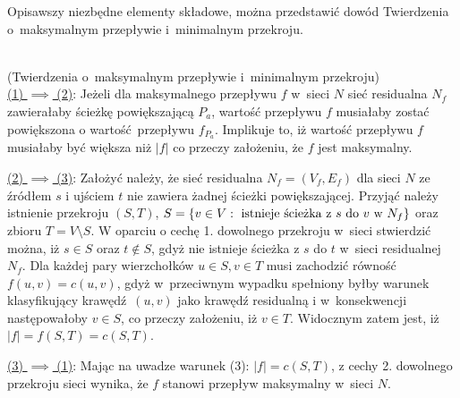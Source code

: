 \par{
  Opisawszy niezbędne elementy składowe, można przedstawić dowód Twierdzenia o~maksymalnym przepływie i~minimalnym przekroju.
\\
\\
  \begin{bproof}{(Twierdzenia o~maksymalnym przepływie i~minimalnym przekroju)\\}
    \underline{(1) $\implies$ (2)}: Jeżeli dla maksymalnego przepływu $f$ w~sieci $N$ sieć residualna $N_f$ zawierałaby ścieżkę powiększającą $P_a$, wartość przepływu $f$ musiałaby zostać powiększona o wartość przepływu $f_{P_a}$.
    Implikuje to, iż wartość przepływu $f$ musiałaby być większa niż $|f|$ co przeczy założeniu, że $f$ jest maksymalny.

    \underline{(2) $\implies$ (3)}: Założyć należy, że sieć residualna $N_f=(V_f, E_f)$ dla sieci $N$ ze źródłem $s$ i ujściem $t$ nie zawiera żadnej ścieżki powiększającej.
    Przyjąć należy istnienie przekroju $(S, T)$, $S=\{v \in V:\textnormal{ istnieje ścieżka z }s\textnormal{ do }v\textnormal{ w~}N_f\}$ oraz zbioru $T=V\setminus S$.
    W oparciu o cechę 1. dowolnego przekroju w~sieci stwierdzić można, iż $s \in S$ oraz $t \notin S$, gdyż nie istnieje ścieżka z $s$ do $t$ w~sieci residualnej $N_f$.
    Dla każdej pary wierzchołków $u \in S, v \in T$ musi zachodzić równość $f(u, v)=c(u, v)$, gdyż w~przeciwnym wypadku spełniony byłby warunek klasyfikujący krawędź $(u,v)$ jako krawędź residualną i w~konsekwencji następowałoby $v \in S$, co przeczy założeniu, iż $v \in T$.
    Widocznym zatem jest, iż $|f|=f(S, T)=c(S, T)$.

    \underline{(3) $\implies$ (1)}: Mając na uwadze warunek (3): $|f|=c(S,T)$, z cechy 2. dowolnego przekroju sieci wynika, że $f$ stanowi przepływ maksymalny w~sieci $N$.
  \end{bproof}
}
